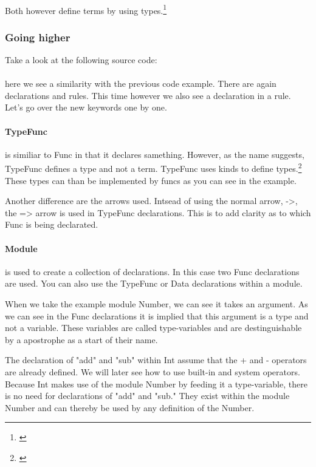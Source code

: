 \paragraph{} Both however define terms by using types.\footnote{\cite{pierce2002types}}

\subsubsection{Going higher}
Take a look at the following source code:

\paragraph{} here we see a similarity with the previous code example.
There are again declarations and rules.
This time however we also see a declaration in a rule.
Let's go over the new keywords one by one.

\paragraph{TypeFunc} is similiar to Func in that it declares samething.
However, as the name suggests, TypeFunc defines a type and not a term.
TypeFunc uses kinds to define types.\footnote{\cite{pierce2002types}}
These types can than be implemented by funcs as you can see in the example.

Another difference are the arrows used.
Intsead of using the normal arrow, ->, the => arrow is used in TypeFunc declarations.
This is to add clarity as to which Func is being declarated.

\paragraph{Module} is used to create a collection of declarations.
In this case two Func declarations are used.
You can also use the TypeFunc or Data declarations within a module.

When we take the example module Number, we can see it takes an argument.
As we can see in the Func declarations it is implied that this argument is a type and not a variable.
These variables are called type-variables and are destinguishable by a apostrophe as a start of their name.

The declaration of "add" and "sub" within Int assume that the + and - operators are already defined.
We will later see how to use built-in and system operators.\cite{something}
Because Int makes use of the module Number by feeding it a type-variable, there is no need for declarations of "add" and "sub."
They exist within the module Number and can thereby be used by any definition of the Number.





